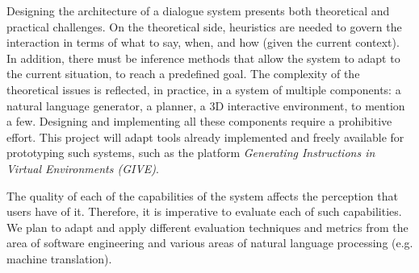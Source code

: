 
Designing the architecture of a dialogue system presents both theoretical and
practical challenges. On the theoretical side, heuristics are needed to govern
the interaction in terms of what to say, when, and how (given the current
context). In addition, there must be inference methods that allow the system to
adapt to the current situation, to reach a predefined goal. The complexity of
the theoretical issues is reflected, in practice, in a system of
multiple components: a natural language generator, a planner,
a 3D interactive environment, to mention a few. Designing
and implementing all these components require a prohibitive effort. This project
will adapt tools already implemented and freely available for prototyping such
systems, such as the platform \emph{Generating Instructions in Virtual
Environments (GIVE)}\cite{byron09}. 


The quality of each of the capabilities of the system affects the perception
that users have of it. Therefore, it is imperative to evaluate each of such
capabilities. We plan to adapt and apply different evaluation techniques and
metrics from the area of software engineering and various areas of
natural language processing (e.g. machine translation).
